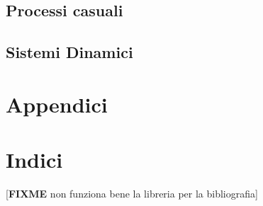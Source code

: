 \documentclass[a4paper,10pt]{book}
\begin{document}
\chapter{Processi casuali}
  
  
  
  
  

\chapter{Sistemi Dinamici}
  
  
  
  
  
  
  
  
  

\part{Appendici}
\appendix





\part{Indici}

\printindex
\listoffigures   %




%

[\textbf{FIXME} non funziona bene la libreria per la bibliografia]
\end{document}
